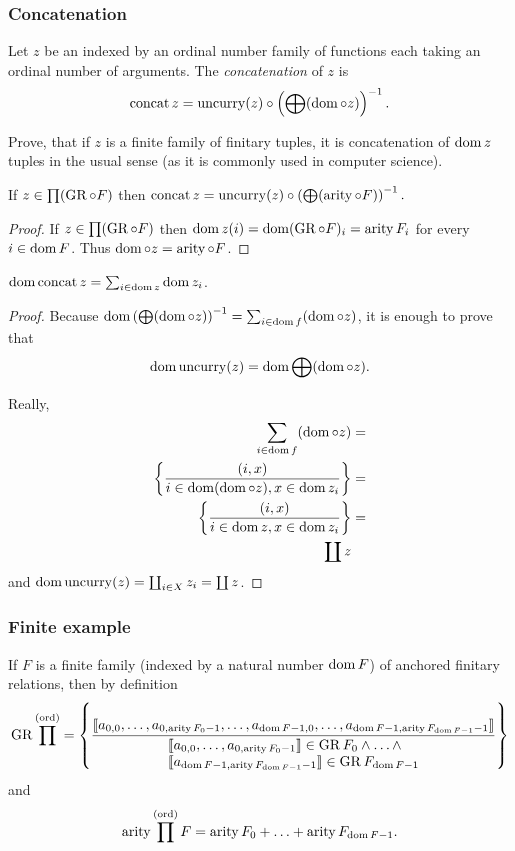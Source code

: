 \subsubsection{Concatenation}
\begin{defn}
Let $z$ be an indexed by an ordinal number
family of functions each taking an ordinal number of arguments. The
\emph{concatenation} of $z$ is
\[
\operatorname{concat} z=\operatorname{uncurry}(z)\circ\left(\bigoplus(\operatorname{dom}\circ z)\right)^{-1}.
\]
\end{defn}
\begin{xca}
Prove, that if $z$ is a finite family of finitary tuples, it is concatenation
of $\operatorname{dom} z$ tuples in the usual sense (as it is commonly used in
computer science).\end{xca}
\begin{prop}
If $z\in\prod(\operatorname{GR}\circ F)$ then $\operatorname{concat} z=\operatorname{uncurry}(z)\circ\left(\bigoplus(\operatorname{arity}\circ F)\right)^{-1}.$\end{prop}
\begin{proof}
If $z\in\prod(\operatorname{GR}\circ F)$ then $\operatorname{dom} z(i)=\operatorname{dom}(\operatorname{GR}\circ F)_{i}=\operatorname{arity} F_{i}$
for every $i\in\operatorname{dom} F$. Thus $\operatorname{dom}\circ z=\operatorname{arity}\circ F$.\end{proof}
\begin{prop}
$\operatorname{dom}\operatorname{concat} z=\sum_{i\in\operatorname{dom} z}\operatorname{dom} z_{i}$.\end{prop}
\begin{proof}
Because $\operatorname{dom}\left(\bigoplus(\operatorname{dom}\circ z)\right)^{-1}=\sum_{i\in\operatorname{dom} f}(\operatorname{dom}\circ z)$,
it is enough to prove that
\[
\operatorname{dom}\operatorname{uncurry}(z)=\operatorname{dom}\bigoplus(\operatorname{dom}\circ z).
\]


Really,
\begin{align*}
\sum_{i\in\operatorname{dom} f}(\operatorname{dom}\circ z) & =\\
\left\{ \frac{(i,x)}{i\in\operatorname{dom}(\operatorname{dom}\circ z),x\in\operatorname{dom} z_{i}}\right\} & =\\
\left\{ \frac{(i,x)}{i\in\operatorname{dom} z,x\in\operatorname{dom} z_{i}}\right\} & =\\
\coprod z
\end{align*}
and $\operatorname{dom}\operatorname{uncurry}(z)=\coprod_{i\in X}z_{i}=\coprod z$.
\end{proof}

\subsubsection{Finite example}

If $F$ is a finite family (indexed by a natural number $\operatorname{dom} F$)
of anchored finitary relations, then by definition \[
\operatorname{GR}\prod^{\mathrm{(ord)}} =
\left\{ \frac{
\llbracket a_{0, 0} , \ldots , a_{0, \operatorname{arity} F_0 - 1} , \ldots , a_{\operatorname{dom} F - 1, 0} , \ldots , a_{\operatorname{dom} F - 1, \operatorname{arity} F_{\operatorname{dom} F - 1} - 1} \rrbracket
}{
\begin{array}{l}
\llbracket a_{0, 0} , \ldots , a_{0, \operatorname{arity} F_0 - 1} \rrbracket \in \operatorname{GR} F_0 \land \ldots \land \\ \llbracket a_{\operatorname{dom} F - 1, \operatorname{arity} F_{\operatorname{dom} F - 1} - 1} \rrbracket \in \operatorname{GR} F_{\operatorname{dom} F - 1}
\end{array}
}\right\}
\]and 
\[
\operatorname{arity}\prod^{\mathrm{(ord)}}F=\operatorname{arity} F_{0}+\ldots+\operatorname{arity} F_{\operatorname{dom} F-1}.
\]


